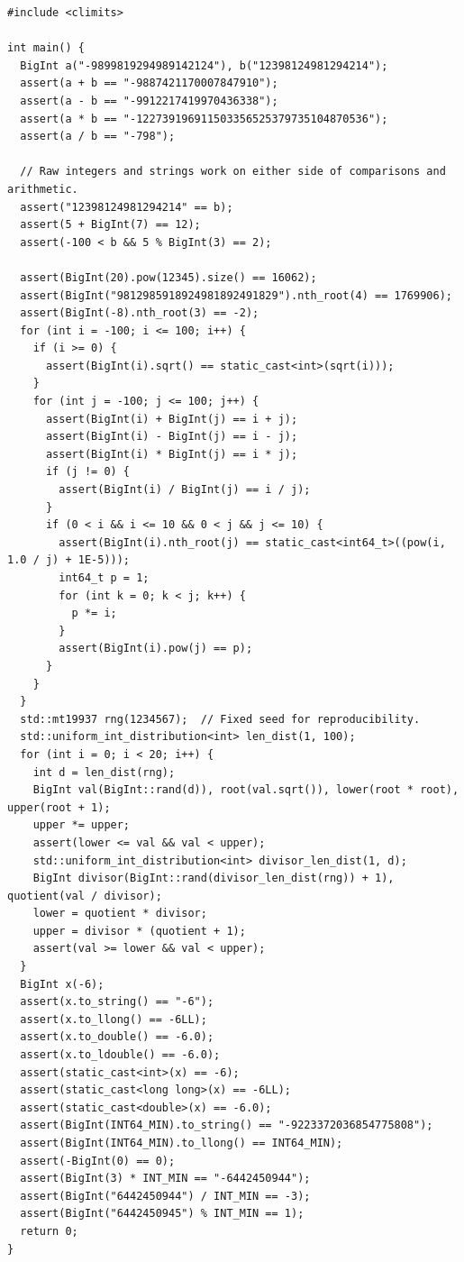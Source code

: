 \begin{lstlisting}[style=cpp]
#include <climits>

int main() {
  BigInt a("-9899819294989142124"), b("12398124981294214");
  assert(a + b == "-9887421170007847910");
  assert(a - b == "-9912217419970436338");
  assert(a * b == "-122739196911503356525379735104870536");
  assert(a / b == "-798");

  // Raw integers and strings work on either side of comparisons and arithmetic.
  assert("12398124981294214" == b);
  assert(5 + BigInt(7) == 12);
  assert(-100 < b && 5 % BigInt(3) == 2);

  assert(BigInt(20).pow(12345).size() == 16062);
  assert(BigInt("9812985918924981892491829").nth_root(4) == 1769906);
  assert(BigInt(-8).nth_root(3) == -2);
  for (int i = -100; i <= 100; i++) {
    if (i >= 0) {
      assert(BigInt(i).sqrt() == static_cast<int>(sqrt(i)));
    }
    for (int j = -100; j <= 100; j++) {
      assert(BigInt(i) + BigInt(j) == i + j);
      assert(BigInt(i) - BigInt(j) == i - j);
      assert(BigInt(i) * BigInt(j) == i * j);
      if (j != 0) {
        assert(BigInt(i) / BigInt(j) == i / j);
      }
      if (0 < i && i <= 10 && 0 < j && j <= 10) {
        assert(BigInt(i).nth_root(j) == static_cast<int64_t>((pow(i, 1.0 / j) + 1E-5)));
        int64_t p = 1;
        for (int k = 0; k < j; k++) {
          p *= i;
        }
        assert(BigInt(i).pow(j) == p);
      }
    }
  }
  std::mt19937 rng(1234567);  // Fixed seed for reproducibility.
  std::uniform_int_distribution<int> len_dist(1, 100);
  for (int i = 0; i < 20; i++) {
    int d = len_dist(rng);
    BigInt val(BigInt::rand(d)), root(val.sqrt()), lower(root * root), upper(root + 1);
    upper *= upper;
    assert(lower <= val && val < upper);
    std::uniform_int_distribution<int> divisor_len_dist(1, d);
    BigInt divisor(BigInt::rand(divisor_len_dist(rng)) + 1), quotient(val / divisor);
    lower = quotient * divisor;
    upper = divisor * (quotient + 1);
    assert(val >= lower && val < upper);
  }
  BigInt x(-6);
  assert(x.to_string() == "-6");
  assert(x.to_llong() == -6LL);
  assert(x.to_double() == -6.0);
  assert(x.to_ldouble() == -6.0);
  assert(static_cast<int>(x) == -6);
  assert(static_cast<long long>(x) == -6LL);
  assert(static_cast<double>(x) == -6.0);
  assert(BigInt(INT64_MIN).to_string() == "-9223372036854775808");
  assert(BigInt(INT64_MIN).to_llong() == INT64_MIN);
  assert(-BigInt(0) == 0);
  assert(BigInt(3) * INT_MIN == "-6442450944");
  assert(BigInt("6442450944") / INT_MIN == -3);
  assert(BigInt("6442450945") % INT_MIN == 1);
  return 0;
}
\end{lstlisting}
